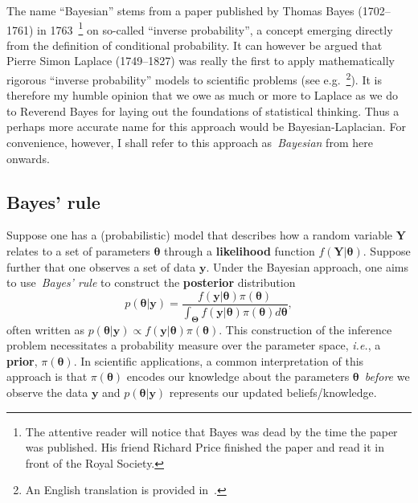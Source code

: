The name ``Bayesian'' stems from a paper published by Thomas Bayes (1702--1761) in 1763~\citep{Bayes1763}\footnote{The attentive reader will notice that Bayes was dead by the time the paper was published. His friend Richard Price finished the paper and read it in front of the Royal Society.} on so-called ``inverse probability'', a concept emerging directly from the definition of conditional probability.
It can however be argued that Pierre Simon Laplace (1749--1827) was really the first to apply mathematically rigorous ``inverse probability'' models to scientific problems (see e.g.~\cite{Laplace1774}\footnote{An English translation is provided in~\cite{Stigler1986}.}).
It is therefore my humble opinion that we owe as much or more to Laplace as we do to Reverend Bayes for laying out the foundations of statistical thinking.
Thus a perhaps more accurate name for this approach would be Bayesian-Laplacian.
For convenience, however, I shall refer to this approach as~\textit{Bayesian} from here onwards.
 
\subsection{Bayes' rule}

Suppose one has a (probabilistic) model that describes how a random variable $\boldsymbol Y$ relates to a set of parameters $\boldsymbol\theta$ through a \textbf{likelihood} function $f(\boldsymbol Y| \boldsymbol\theta)$.
Suppose further that one observes a set of data $\boldsymbol y$.
Under the Bayesian approach, one aims to use~\textit{Bayes' rule} to construct the \textbf{posterior} distribution
\[ p(\boldsymbol\theta | \boldsymbol y) = \frac{f(\boldsymbol y| \boldsymbol\theta) \pi(\boldsymbol\theta)}{\int_{\boldsymbol\Theta}f(\boldsymbol y| \boldsymbol\theta) \pi(\boldsymbol\theta)d\boldsymbol\theta } ,\]
often written as $p(\boldsymbol\theta | \boldsymbol y) \propto f(\boldsymbol y | \boldsymbol\theta)\pi(\boldsymbol\theta)$.
This construction of the inference problem necessitates a probability measure over the parameter space, \textit{i.e.}, a \textbf{prior}, $\pi(\boldsymbol\theta)$.
In scientific applications, a common interpretation of this approach is that $\pi(\boldsymbol\theta)$ encodes our knowledge about the parameters $\boldsymbol\theta$~\textit{before} we observe the data $\boldsymbol y$ and $p(\boldsymbol\theta | \boldsymbol y)$ represents our updated beliefs/knowledge.

